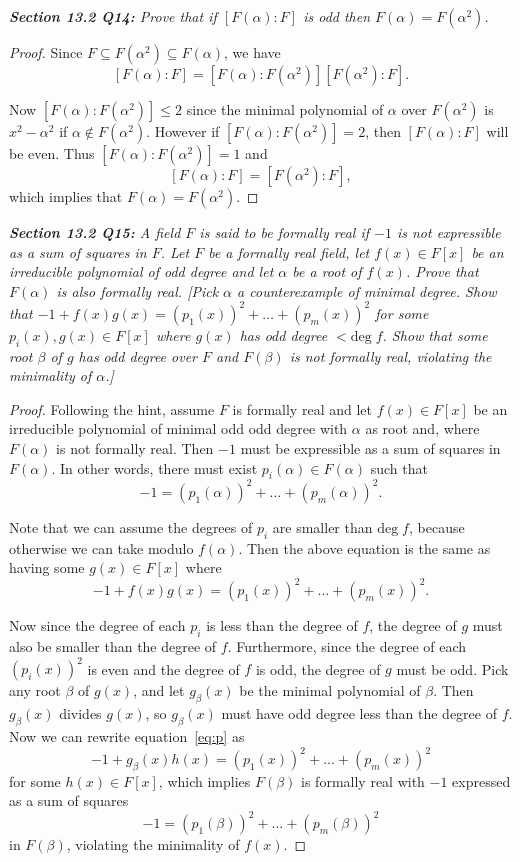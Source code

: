 \documentclass{article}
\begin{document}
\it \textbf{Section 13.2 Q14:} Prove that if $[F(\alpha):F]$ is odd then
  $F(\alpha)=F(\alpha^2)$.

  \begin{proof}
    Since $F\subseteq F(\alpha^2) \subseteq F(\alpha)$, we have
    \[[F(\alpha):F] =[F(\alpha):F(\alpha^2)] [F(\alpha^2):F].\]

    Now $[F(\alpha):F(\alpha^2)]\leq2$ since the minimal polynomial of
    $\alpha$ over $F(\alpha^2)$ is $x^2-\alpha^2$ if $\alpha\not\in
    F(\alpha^2)$. However if $[F(\alpha):F(\alpha^2)]=2$, then
    $[F(\alpha):F]$ will be even. Thus $[F(\alpha):F(\alpha^2)]=1$ and
    \[[F(\alpha):F] =[F(\alpha^2):F],\]
    which implies that $F(\alpha)=F(\alpha^2)$.
  \end{proof}

\it \textbf{Section 13.2 Q15:} A field $F$ is said to be formally real if
  $-1$ is not expressible as a sum of squares in $F$. Let $F$ be a formally
  real field, let $f(x)\in F[x]$ be an irreducible polynomial of odd degree
  and let $\alpha$ be a root of $f(x)$. Prove that $F(\alpha)$ is also
  formally real. [Pick $\alpha$ a counterexample of minimal degree. Show
  that $-1+f(x)g(x) =(p_1(x))^2 +\ldots +(p_m(x))^2$ for some
  $p_i(x),g(x)\in F[x]$ where $g(x)$ has odd degree $<\text{deg}\; f$. Show
  that some root $\beta$ of $g$ has odd degree over $F$ and $F(\beta)$ is
  not formally real, violating the minimality of $\alpha$.] 

  \begin{proof}
    Following the hint, assume $F$ is formally real and let $f(x)\in F[x]$
    be an irreducible polynomial of minimal odd odd degree with $\alpha$ as
    root and, where $F(\alpha)$ is not formally real. Then $-1$ must be
    expressible as a sum of squares in $F(\alpha)$. In other words, there
    must exist $p_i(\alpha)\in F(\alpha)$ such that
    \[-1 =(p_1(\alpha))^2 +\ldots +(p_m(\alpha))^2.\]

    Note that we can assume the degrees of $p_i$ are smaller than
    $\text{deg}\; f$, because otherwise we can take modulo $f(\alpha)$.
    Then the above equation is the same as having some $g(x)\in F[x]$ where
    \begin{equation}
      -1+f(x)g(x) =(p_1(x))^2 +\ldots +(p_m(x))^2.
      \label{eq:p}
    \end{equation}

    Now since the degree of each $p_i$ is less than the degree of $f$, the
    degree of $g$ must also be smaller than the degree of $f$. Furthermore,
    since the degree of each $(p_i(x))^2$ is even and the degree of $f$ is
    odd, the degree of $g$ must be odd. Pick any root $\beta$ of $g(x)$,
    and let $g_\beta(x)$ be the minimal polynomial of $\beta$. Then
    $g_\beta(x)$ divides $g(x)$, so $g_\beta(x)$ must
    have odd degree less than the degree of $f$. Now we can rewrite
    equation~\ref{eq:p} as
    \[-1+g_\beta(x)h(x) =(p_1(x))^2 +\ldots +(p_m(x))^2\]
    for some $h(x)\in F[x]$, which implies $F(\beta)$ is formally real with
    $-1$ expressed as a sum of squares
    \[-1 =(p_1(\beta))^2 +\ldots +(p_m(\beta))^2\]
    in $F(\beta)$, violating the minimality of $f(x)$.
  \end{proof}
\end{document}
